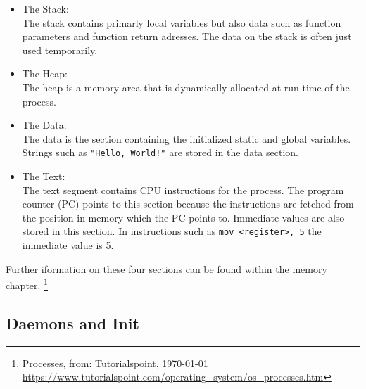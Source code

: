\begin{itemize}
\item The Stack: \\

The stack contains primarly local variables but also data such as function parameters and function return adresses. The data on the stack is often just used temporarily.
\item The Heap: \\

The heap is a memory area that is dynamically allocated at run time of the process.
\item The Data: \\

	The data is the section containing the initialized static and global variables. Strings such as \texttt{"Hello, World!"} are stored
	in the data section.
\item The Text: \\

	The text segment contains CPU instructions for the process. The program counter (PC) points to this section because the instructions are
		fetched from the position in memory which the PC points to. Immediate values are also stored in this section.
		In instructions such as \texttt{mov \textless register\textgreater, 5} the immediate value is 5.
\end{itemize}

Further iformation on these four sections can be found within the memory chapter. \footnote{Processes, from: Tutorialspoint, \today \\ \url{https://www.tutorialspoint.com/operating_system/os_processes.htm} }


\subsection{Daemons and Init}

